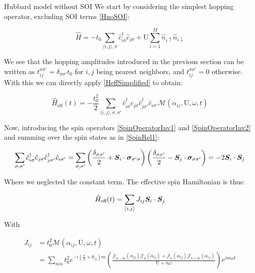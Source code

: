\begin{section}{Hubbard model without SOI}
\label{Section3Hubbard}
We start by considering the simplest hopping operator, excluding SOI terms \ref{HnoSOI}:

\begin{equation}
\hat{H} = -t_0\sum_{\langle i,j \rangle, \sigma} \hat{c}_{i \sigma}^\dagger \hat{c}_{j \sigma} + \text{U} \sum_{i=1}^M \hat{n}_{i\uparrow}\hat{n}_{i\downarrow}
\end{equation}

We see that the hopping amplitudes introduced in the previous section can be written as $t_{ij}^{\sigma \sigma'} = \delta_{\sigma \sigma'} t_0$ for $i,j$ being nearest neighbors, and $t_{ij}^{\sigma \sigma'} = 0$ otherwise. With this we can directly apply \ref{HeffSimplified} to obtain:

\begin{equation}
\hat{H}_{\text{eff}}(t) = -\frac{t_0^2}{2} \sum_{\langle i,j \rangle, \sigma, \sigma'} \hat{c}_{i \sigma}^\dagger \hat{c}_{j \sigma} \hat{c}_{j \sigma'}^\dagger \hat{c}_{i \sigma'} \mathcal{M}(\alpha_{ij}, \text{U}, \omega, t)
\end{equation}

Now, introducing the spin operators \ref{SpinOperatorInv1} and \ref{SpinOperatorInv2} and summing over the spin states as in \ref{SpinRel1}:

\begin{align*}
\sum_{\sigma, \sigma'} \hat{c}_{i \sigma}^\dagger \hat{c}_{j \sigma} \hat{c}_{j \sigma'}^\dagger \hat{c}_{i \sigma'} = \sum_{\sigma, \sigma'} \left( \frac{\delta_{\sigma \sigma'}}{2} + \boldsymbol{S}_i\cdot\boldsymbol{\sigma}_{\sigma' \sigma} \right) \left( \frac{\delta_{\sigma \sigma'}}{2} - \boldsymbol{S}_j\cdot\boldsymbol{\sigma}_{\sigma \sigma'} \right) = -2\boldsymbol{S}_i\cdot \boldsymbol{S}_j
\end{align*}

Where we neglected the constant term. The effective spin Hamiltonian is thus:

\begin{equation}
\hat{H}_{\text{eff}}(t) = \sum_{\langle i,j \rangle} J_{ij} \boldsymbol{S}_i \cdot \boldsymbol{S}_j
\end{equation}

With 

\begin{align}
J_{ij} &= t_0^2 \mathcal{M}(\alpha_{ij}, \text{U}, \omega, t) \nonumber \\
&=\sum_{mn} t_0^2 e^{-i(\frac{\pi}{2}+\theta_{ij})m}\left(\frac{\mathcal{J}_{n-m}(\alpha_{ij})\mathcal{J}_{n}(\alpha_{ij})+\mathcal{J}_{n}(\alpha_{ij})\mathcal{J}_{n+m}(\alpha_{ij})}{\text{U}+n\omega} \right) e^{im\omega t} \label{Jij1}
\end{align}


\end{section}
